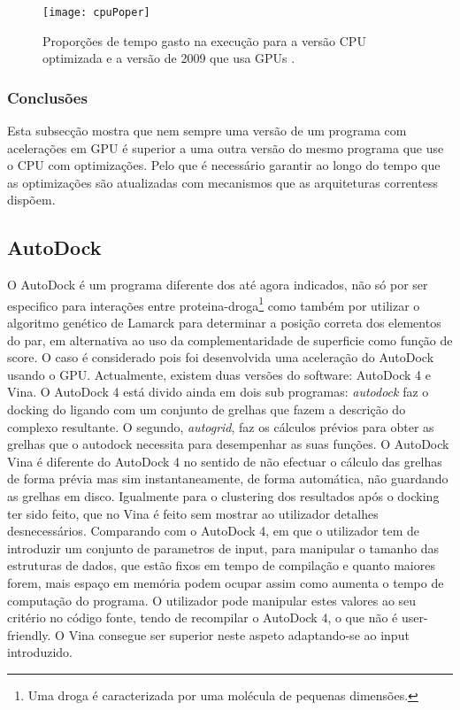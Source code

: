     \begin{figure}[ht]
  \centering
    {\texttt{[image: cpuPoper]}}
  \caption{Proporções de tempo gasto na execução para a versão CPU optimizada e a versão de 2009 que usa GPUs\cite{piper2014gpu} . }
  \label{propPiper}
\end{figure}
\subsubsection{Conclusões}
Esta subsecção mostra que nem sempre uma versão de um programa com acelerações em GPU é superior a uma outra versão do mesmo programa que use o CPU com optimizações. Pelo que é necessário garantir ao longo do tempo que as optimizações são atualizadas com mecanismos que as arquiteturas correntess dispõem.
\subsection {AutoDock}
O AutoDock \cite{autoDock} é um programa diferente dos até agora indicados, não só por ser especifico para interações entre proteina-droga\footnote[6]{Uma droga é caracterizada  por uma molécula de pequenas dimensões.} como também por utilizar o algoritmo genético de Lamarck para determinar a posição correta dos elementos do par, em alternativa ao uso da complementaridade de superficie como função de score. O caso é considerado pois foi desenvolvida uma aceleração do AutoDock usando o GPU\cite{autodockCuda}.
Actualmente, existem duas versões do software: AutoDock 4 e Vina. O AutoDock 4 está divido ainda em dois sub programas: \textit{autodock} faz o docking do ligando com um conjunto de grelhas que fazem a descrição do complexo resultante. O segundo, \textit{autogrid}, faz os cálculos prévios para obter as grelhas que o autodock necessita para desempenhar as suas funções.  
O AutoDock Vina \cite{autoDockVina} é diferente do AutoDock 4 no sentido de não efectuar o cálculo das grelhas de forma prévia mas sim instantaneamente, de forma automática, não guardando as grelhas em disco. Igualmente para o clustering dos resultados após o docking ter sido feito, que no Vina é feito sem mostrar ao utilizador detalhes desnecessários.
Comparando com o AutoDock 4, em que o utilizador tem de introduzir um conjunto de parametros de input, para manipular o tamanho das estruturas de dados, que estão fixos em tempo de compilação e quanto maiores forem, mais espaço em memória podem ocupar assim como aumenta o tempo de computação do programa. O utilizador pode manipular estes valores ao seu critério no código fonte, tendo de recompilar o AutoDock 4, o que não é user-friendly. O Vina consegue ser superior neste aspeto adaptando-se ao input introduzido.

